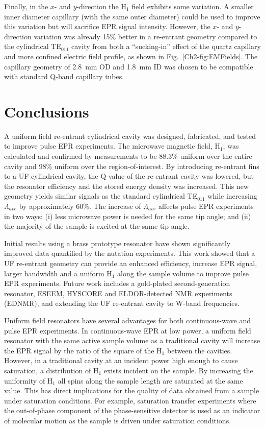Finally, in the $x$- and $y$-direction the H$_1$ field exhibits some variation. A smaller inner diameter capillary (with the same outer diameter) could be used to improve this variation but will sacrifice EPR signal intensity. However, the $x$- and $y$-direction variation was already 15\% better in a re-entrant geometry compared to the cylindrical TE$_{011}$ cavity from both a ``sucking-in'' effect of the quartz capillary and more confined electric field profile, as shown in Fig.~\ref{Ch2-fig:EMFields}. The capillary geometry of 2.8~mm OD and 1.8~mm ID was chosen to be compatible with standard Q-band capillary tubes. 

\section{Conclusions}
A uniform field re-entrant cylindrical \cylTE{} cavity was designed, fabricated, and tested to improve pulse EPR experiments. The microwave magnetic field, H$_1$, was calculated and confirmed by measurements to be 88.3\% uniform over the entire cavity and 98\% uniform over the region-of-interest. By introducing re-entrant fins to a UF cylindrical \cylTE{} cavity, the Q-value of the re-entrant \cylTE{} cavity was lowered, but the resonator efficiency and the stored energy density was increased. This new geometry yields similar signals as the standard cylindrical TE$_{011}$ while increasing $\Lambda_{ave}$ by approximately 60\%. The increase of $\Lambda_{ave}$ affects pulse EPR experiments in two ways: (i) less microwave power is needed for the same tip angle; and (ii) the majority of the sample is excited at the same tip angle. 

Initial results using a brass prototype resonator have shown significantly improved data quantified by the nutation experiments. This work showed that a UF re-entrant geometry can provide an enhanced efficiency, increase EPR signal, larger bandwidth and a uniform H$_1$ along the sample volume to improve pulse EPR experiments. Future work includes a gold-plated second-generation resonator, ESEEM, HYSCORE and ELDOR-detected NMR experiments (EDNMR), and extending the UF re-entrant \cylTE{} cavity to W-band frequencies.

Uniform field resonators have several advantages for both continuous-wave and pulse EPR experiments. In continuous-wave EPR at low power, a uniform field resonator with the same active sample volume as a traditional cavity will increase the EPR signal by the ratio of the square of the H$_1$ between the cavities. However, in a traditional cavity at an incident power high enough to cause saturation, a distribution of H$_1$ exists incident on the sample. By increasing the uniformity of H$_1$ all spins along the sample length are saturated at the same value. This has direct implications for the quality of data obtained from a sample under saturation conditions. For example, saturation transfer experiments where the out-of-phase component of the phase-sensitive detector is used as an indicator of molecular motion as the sample is driven under saturation conditions. \cite{SaturationTransfer2005} 

